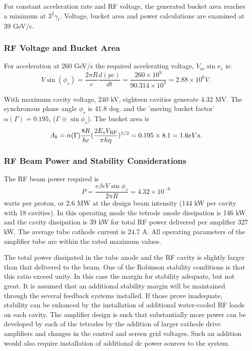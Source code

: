 \documentclass{article}
\begin{document}
For constant acceleration rate and RF voltage, the generated bucket area 
reaches a minimum at $3^2 \gamma_t$. Voltage, bucket area and power 
calculations are examined at 39 GeV/c. 

\subsubsection {RF Voltage and Bucket Area} 

For acceleration at 260 GeV/s the required accelerating voltage, 
$V_{ac}\sin \nu_s$ is:
\begin {equation}
V \sin(\phi_s) = \frac{2\pi R}{c} \frac {d(pc)}{dt} = \frac {260 \times 10^9}
{90.314 \times 10^3} = 2.88 \times 10^6 V.
\end {equation} 

With maximum cavity voltage, 240 kV, eighteen cavities generate 4.32 MV.  
The synchronous phase angle $\phi_s$ is 41.8 deg. and the 
'moving bucket factor' $\alpha(\Gamma) =  0.195$,  
($\Gamma \equiv \sin \phi_s$). The bucket area is
\begin {equation}
A_b = \alpha(\Gamma)\frac{8R}{hc}(\frac{2E_sV_{\rm RF}}{\pi h \eta})^{1/2} =
0.195 \times 8.1 = 1.6 eVs.
\end {equation}

\subsubsection {RF Beam Power and Stability Considerations}

The RF beam power required is
\begin {displaymath}
P=\frac {e\beta cV\sin\phi_s}{2\pi R} = 4.32 \times 10^{-8}
\end {displaymath}
watts per proton, or 
2.6 MW at the design beam intensity (144 kW per cavity with 18 cavities).  In 
this operating mode the tetrode anode dissipation is 146 kW and the cavity 
dissipation is 39 kW for total RF power delivered per amplifier 327 kW.  The 
average tube cathode current is 24.7 A.  All operating parameters of the 
amplifier tube are within the rated maximum values.  

The total power dissipated in the tube anode and the RF cavity is slightly 
larger than that delivered to the beam. One of the Robinson stability 
conditions is that this ratio exceed unity.  In this case the margin for 
stability adequate, but not 
great.  It is assumed that an additional stability margin will be maintained 
through the several feedback systems installed.  If those prove inadequate, 
stability can be enhanced by the installation of additional water-cooled RF
loads on each cavity.  The amplifier design is such that substantially more 
power can be developed by each of the tetrodes by the addition of larger 
cathode drive amplifiers and changes in the control and screen grid voltages. 
Such an addition would also require installation of additional dc power sources
to the system.  
\end{document}
